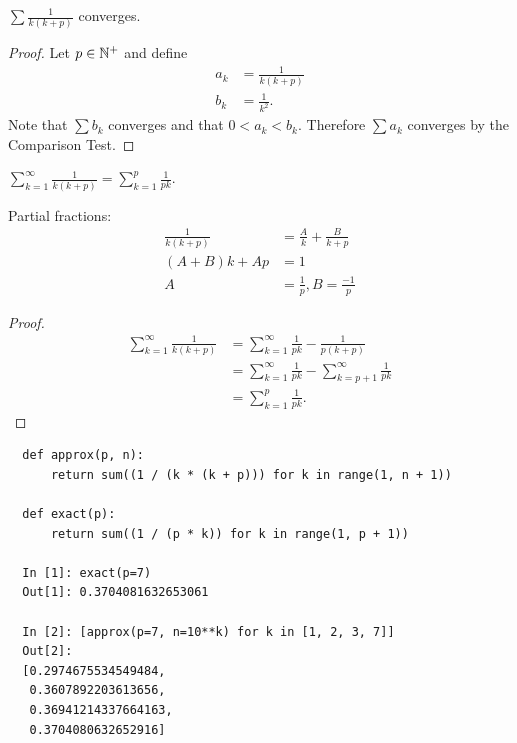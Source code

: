 \documentclass[12pt]{article}
\begin{document}
\begin{claim*}
  $\sum \frac{1}{k(k+p)}$ converges.
\end{claim*}

\begin{proof}
  Let $p \in \mathbb{N}^+$ and define
  \begin{align*}
    a_k &= \frac{1}{k(k + p)}\\
    b_k &= \frac{1}{k^2}.
  \end{align*}
  Note that $\sum b_k$ converges and that $0 < a_k < b_k$. Therefore $\sum a_k$ converges by the
  Comparison Test. 
\end{proof}

\begin{claim*}
  $\sum_{k=1}^\infty \frac{1}{k(k+p)} = \sum_{k=1}^p\frac{1}{pk}$.
\end{claim*}

\begin{mdframed}
  Partial fractions:
\begin{align*}
  \frac{1}{k(k+p)} &= \frac{A}{k} + \frac{B}{k + p}\\
  (A + B)k + Ap &= 1\\
  A &= \frac{1}{p}, B = \frac{-1}{p}
\end{align*}
\end{mdframed}

\begin{proof}
  \begin{align*}
    \sum_{k=1}^\infty \frac{1}{k(k+p)} &= \sum_{k=1}^\infty \frac{1}{pk} - \frac{1}{p(k + p)}\\
                                       &= \sum_{k=1}^\infty \frac{1}{pk} - \sum_{k=p+1}^\infty  \frac{1}{pk}\\
                                       &= \sum_{k=1}^p\frac{1}{pk}.
  \end{align*}


\end{proof}

\begin{verbatim}
  def approx(p, n):
      return sum((1 / (k * (k + p))) for k in range(1, n + 1))

  def exact(p):
      return sum((1 / (p * k)) for k in range(1, p + 1))

  In [1]: exact(p=7)
  Out[1]: 0.3704081632653061

  In [2]: [approx(p=7, n=10**k) for k in [1, 2, 3, 7]]
  Out[2]:
  [0.2974675534549484,
   0.3607892203613656,
   0.36941214337664163,
   0.3704080632652916]
\end{verbatim}
\end{document}
